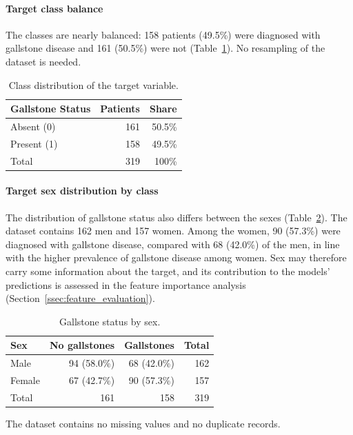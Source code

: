 \documentclass[conference]{IEEEtran}
\begin{document}
\paragraph{Target class balance}
The classes are nearly balanced: 158 patients (49.5\%) were diagnosed with
gallstone disease and 161 (50.5\%) were not (Table~\ref{tab:class_balance}). No resampling of the dataset is needed.

\begin{table}[h]
\centering
\caption{Class distribution of the target variable.}
\label{tab:class_balance}
\begin{tabular}{lrr}
\hline
Gallstone Status & Patients & Share \\
\hline
Absent (0)  & 161 & 50.5\% \\
Present (1) & 158 & 49.5\% \\
\hline
Total       & 319 & 100\% \\
\hline
\end{tabular}
\end{table}

\paragraph{Target sex distribution by class}
The distribution of gallstone status also differs between the sexes
(Table~\ref{tab:sex_distribution}). The dataset contains 162 men and 157 women.
Among the women, 90 (57.3\%) were diagnosed with gallstone disease, compared
with 68 (42.0\%) of the men, in line with the higher prevalence of gallstone
disease among women. Sex may therefore carry some information about the
target, and its contribution to the models' predictions is assessed in the
feature importance analysis (Section~\ref{ssec:feature_evaluation}).

\begin{table}[h]
\centering
\caption{Gallstone status by sex.}
\label{tab:sex_distribution}
\begin{tabular}{lrrr}
\hline
Sex & No gallstones & Gallstones & Total \\
\hline
Male   & 94 (58.0\%) & 68 (42.0\%) & 162 \\
Female & 67 (42.7\%) & 90 (57.3\%) & 157 \\
\hline
Total  & 161 & 158 & 319 \\
\hline
\end{tabular}
\end{table}

The dataset contains no missing values and no duplicate records.
\end{document}
